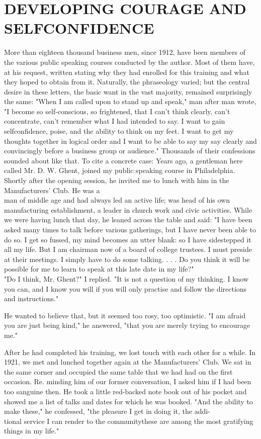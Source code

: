 \documentclass[10pt]{article}
\begin{document}
\section*{DEVELOPING COURAGE AND SELFCONFIDENCE}
More than eighteen thousand business men, since 1912, have been members of the various public speaking courses conducted by the author. Most of them have, at his request, written stating why they had enrolled for this training and what they hoped to obtain from it. Naturally, the phraseology varied; but the central desire in these letters, the basic want in the vast majority, remained surprisingly the same: "When I am called upon to stand up and speak," man after man wrote, "I become so self-conscious, so frightened, that I can't think clearly, can't concentrate, can't remember what I had intended to say. I want to gain selfconfidence, poise, and the ability to think on my feet. I want to get my thoughts together in logical order and I want to be able to say my say clearly and convincingly before a business group or audience." Thousands of their confessions sounded about like that. To cite a concrete case: Years ago, a gentleman here called Mr. D. W. Ghent, joined my public speaking course in Philadelphia. Shortly after the opening session, he invited me to lunch with him in the Manufacturers' Club. He was a\\
man of middle age and had always led an active life; was head of his own manufacturing establishment, a leader in church work and civic activities. While we were having lunch that day, he leaned across the table and said: "I have been asked many times to talk before various gatherings, but I have never been able to do so. I get so fussed, my mind becomes an utter blank: so I have sidestepped it all my life. But I am chairman now of a board of college trustees. I must preside at their meetings. I simply have to do some talking. . . . Do you think it will be possible for me to learn to speak at this late date in my life?"\\
"Do I think, Mr. Ghent?" I replied. "It is not a question of my thinking. I know you can, and I know you will if you will only practise and follow the directions and instructions."

He wanted to believe that, but it seemed too rosy, too optimistic. "I am afraid you are just being kind," he answered, "that you are merely trying to encourage me."

After he had completed his training, we lost touch with each other for a while. In 1921, we met and lunched together again at the Manufacturers' Club. We sat in the same corner and occupied the same table that we had had on the first occasion. Re. minding him of our former conversation, I asked him if I had been too sanguine then. He took a little red-backed note book out of his pocket and showed me a list of talks and dates for which he was booked. "And the ability to make these," he confessed, "the pleasure I get in doing it, the addi-\\
tional service I can render to the communitythese are among the most gratifying things in my life."
\end{document}
